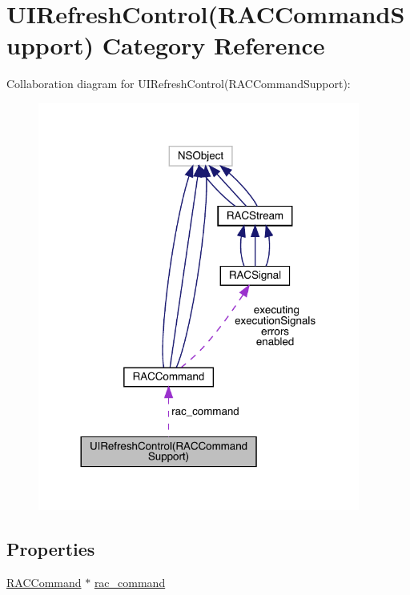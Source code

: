 \hypertarget{category_u_i_refresh_control_07_r_a_c_command_support_08}{}\section{U\+I\+Refresh\+Control(R\+A\+C\+Command\+Support) Category Reference}
\label{category_u_i_refresh_control_07_r_a_c_command_support_08}


Collaboration diagram for U\+I\+Refresh\+Control(R\+A\+C\+Command\+Support)\+:\nopagebreak
\begin{figure}[H]
\begin{center}
\leavevmode
\includegraphics[width=300pt]{category_u_i_refresh_control_07_r_a_c_command_support_08__coll__graph}
\end{center}
\end{figure}
\subsection*{Properties}
\begin{DoxyCompactItemize}
\item 
\mbox{\hyperlink{interface_r_a_c_command}{R\+A\+C\+Command}} $\ast$ \mbox{\hyperlink{category_u_i_refresh_control_07_r_a_c_command_support_08_a5745242acbc3bf93a1cebc652b37c9c3}{rac\+\_\+command}}
\end{DoxyCompactItemize}


